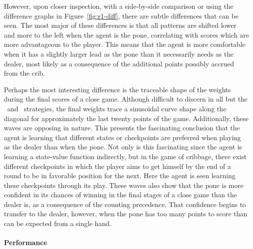 
However,
upon closer inspection,
with a side-by-side comparison
or using the difference graphs in Figure~\ref{fig:r1-diff},
there are subtle differences that can be seen.
%
The most major of these differences is that all patterns are shifted lower and
more to the left when the agent is the pone,
correlating with scores which are more advantageous to the player.
%
This means that the agent is more comfortable when it has a slightly larger
lead as the pone than it necessarily needs as the dealer,
most likely as a consequence of the
additional points possibly accrued from the crib.



Perhaps the most interesting difference is the traceable shape of the weights
during the final scores of a close game.
%
Although difficult to discern in all but the \handmaxmin\ and \handmaxavg\ 
strategies,
the final weights trace a sinusoidal curve shape along the diagonal
for approximately the last twenty points of the game.
%
Additionally,
these waves are opposing in nature.
%
This presents the fascinating conclusion that the agent is learning
that different states or checkpoints are preferred when playing as
the dealer than when the pone.
%
Not only is this fascinating since the agent is learning a state-value function
indirectly,
but in the game of cribbage,
there exist different checkpoints in which the player aims to get
himself by the end of a round to be in favorable position for the next.
%
Here the agent is seen learning these checkpoints through its play.
%
These waves also show that the pone is more confident in its chances
of winning in the final stages of a close game than the dealer is,
as a consequence of the counting precedence.
%
That confidence begins to transfer to the dealer, however,
when the pone has too many points to score
than can be expected from a single hand.


\paragraph*{Performance}

